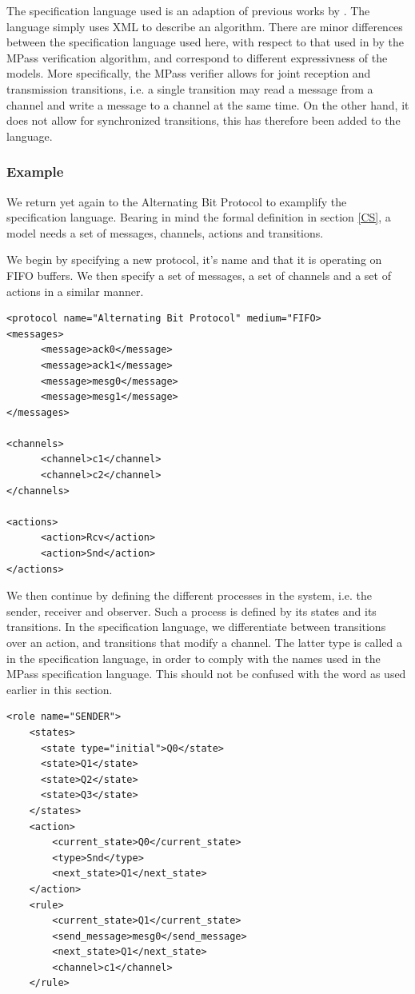 The specification language used is an adaption of previous works by . The language simply uses XML to describe an algorithm. There are minor differences between the specification language used here, with respect to that used in by the MPass verification algorithm, and correspond to different expressivness of the models. More specifically, the MPass verifier allows for joint reception and transmission transitions, i.e. a single transition may read a message from a channel and write a message to a channel at the same time. On the other hand, it does not allow for synchronized transitions, this has therefore been added to the language.

\subsubsection{Example}
We return yet again to the Alternating Bit Protocol to examplify the specification language. Bearing in mind the formal definition in section \ref{CS}, a model needs a set of messages, channels, actions and transitions.

We begin by specifying a new protocol, it's name and that it is operating on FIFO buffers. We then specify a set of messages, a set of channels and a set of actions in a similar manner.

\lstset{language=XML} 
\begin{lstlisting}[frame=single]
<protocol name="Alternating Bit Protocol" medium="FIFO>
<messages>
      <message>ack0</message>
      <message>ack1</message>
      <message>mesg0</message>
      <message>mesg1</message>
</messages>

<channels>
      <channel>c1</channel>
      <channel>c2</channel>
</channels>

<actions>
      <action>Rcv</action>
      <action>Snd</action>
</actions>
\end{lstlisting}

We then continue by defining the different processes in the system, i.e. the sender, receiver and observer. Such a process is defined by its states and its transitions. In the specification language, we differentiate between transitions over an action, and transitions that modify a channel. The latter type is called a  in the specification language, in order to comply with the names used in the MPass specification language. This should not be confused with the word as used earlier in this section.

\begin{lstlisting}[frame=single]
  <role name="SENDER">
    <states>
      <state type="initial">Q0</state>
      <state>Q1</state>
      <state>Q2</state>
      <state>Q3</state>
    </states>
    <action>
        <current_state>Q0</current_state>
        <type>Snd</type>        
        <next_state>Q1</next_state>
    </action>
    <rule>
        <current_state>Q1</current_state>
        <send_message>mesg0</send_message>
        <next_state>Q1</next_state>
        <channel>c1</channel>
    </rule>
\end{lstlisting}

